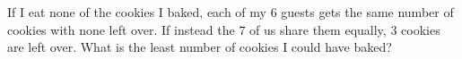 If I eat none of the cookies I baked, each of my $6$ guests gets the same number of cookies with none left over. If instead the $7$ of us share them equally, $3$ cookies are left over. What is the least number of cookies I could have baked?
